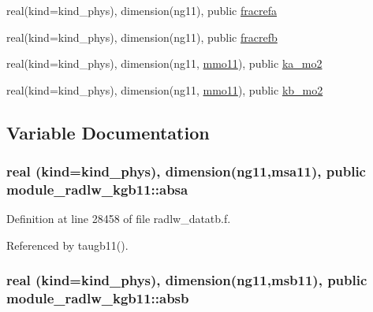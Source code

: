 \begin{DoxyCompactItemize}
\item 
real(kind=kind\+\_\+phys), dimension(ng11), public \hyperlink{namespacemodule__radlw__kgb11_a5bf6552fb9c1e7c35729b2aea885306e}{fracrefa}
\item 
real(kind=kind\+\_\+phys), dimension(ng11), public \hyperlink{namespacemodule__radlw__kgb11_a0a89a2686ebc70a2c0d8577b89384a56}{fracrefb}
\item 
real(kind=kind\+\_\+phys), dimension(ng11, \hyperlink{namespacemodule__radlw__kgb11_a6aabd24aa785ef8689c63b01aaaab243}{mmo11}), public \hyperlink{namespacemodule__radlw__kgb11_a8791eb290525c0d08fefa33ca23569c8}{ka\+\_\+mo2}
\item 
real(kind=kind\+\_\+phys), dimension(ng11, \hyperlink{namespacemodule__radlw__kgb11_a6aabd24aa785ef8689c63b01aaaab243}{mmo11}), public \hyperlink{namespacemodule__radlw__kgb11_aebc48e152bb90794b6d0b426f6c5f9e4}{kb\+\_\+mo2}
\end{DoxyCompactItemize}


\subsection{Variable Documentation}
\subsubsection[{\texorpdfstring{absa}{absa}}]{\setlength{\rightskip}{0pt plus 5cm}real (kind=kind\+\_\+phys), dimension(ng11,{\bf msa11}), public module\+\_\+radlw\+\_\+kgb11\+::absa}\hypertarget{namespacemodule__radlw__kgb11_a7ac883387aa86a635c9aea011c55a1d5}{}\label{namespacemodule__radlw__kgb11_a7ac883387aa86a635c9aea011c55a1d5}


Definition at line 28458 of file radlw\+\_\+datatb.\+f.



Referenced by taugb11().

\subsubsection[{\texorpdfstring{absb}{absb}}]{\setlength{\rightskip}{0pt plus 5cm}real (kind=kind\+\_\+phys), dimension(ng11,{\bf msb11}), public module\+\_\+radlw\+\_\+kgb11\+::absb}\hypertarget{namespacemodule__radlw__kgb11_acf37465675961812e07616e42b137d70}{}\label{namespacemodule__radlw__kgb11_acf37465675961812e07616e42b137d70}


